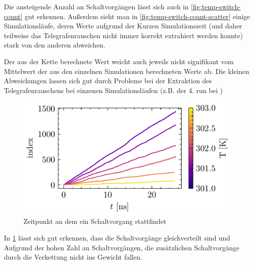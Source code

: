 \documentclass[main.tex]{subfiles}
\begin{document}
Die ansteigende Anzahl an Schaltvorgängen lässt sich auch in \cref{fig:temp-switch-count} gut erkennen. Außerdem sieht man in \cref{fig:temp-switch-count-scatter} einige Simulationsläufe, deren Werte aufgrund der Kurzen Simulationszeit (und daher teilweise das Telegrafenrauschen nicht immer korrekt extrahiert werden konnte) stark von den anderen abweichen.

Der aus der Kette berechnete Wert weicht auch jeweils nicht signifikant vom Mittelwert der aus den einzelnen Simulationen berechneten Werte ab.
Die kleinen Abweichungen lassen sich gut durch Probleme bei der Extraktion des Telegrafenrauschens bei einzenen Simulationsläufen (z.B. der 4. run bei )

\begin{figure}[H]
    \centering
    \includegraphics{bilder/plots/temp_comparison/switch_events.pdf}
    \caption{Zeitpunkt an dem ein Schaltvorgang stattfindet}\label{fig:switch-events}
\end{figure}

In \cref{fig:switch-events} lässt sich gut erkennen, dass die Schaltvorgänge gleichverteilt sind und Aufgrund der hohen Zahl an Schaltvorgängen, die zusätzlichen Schaltvorgänge durch die Verkettung nicht ins Gewicht fallen.
\end{document}
